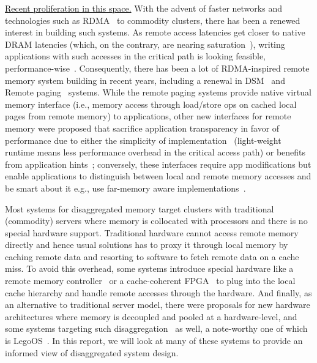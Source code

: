 \vspace{5pt}
\noindent \uline{Recent proliferation in this space.}
With the advent of faster networks and technologies such as 
RDMA~\cite{farm} to commodity clusters, there has been a renewed 
interest in building such systems. 
As remote access latencies 
get closer to native DRAM latencies (which, on the contrary, 
are nearing saturation~\cite{Aguilera2017}),
writing applications with such accesses 
in the critical path is looking feasible, 
performance-wise~\cite{netdisagg}. 
Consequently, there has been a lot of RDMA-inspired remote 
memory system building in recent years, including a renewal in
DSM~\cite{farm, gam,dspm,ltdsm} and Remote 
paging~\cite{Lim2012,bladedisagg1,infiniswap,zswap,fastswap,leap} 
systems. While the remote paging systems provide native virtual memory 
interface (i.e., memory access through load/store ops on cached 
local pages from remote memory) to applications, 
other new interfaces for remote memory were proposed that 
sacrifice application transparency in favor of performance 
due to either the simplicity of 
implementation~\cite{remregions,literdma} (light-weight runtime 
means less performance overhead in the critical access path) or 
benefits from application hints~\cite{aifm}; 
conversely, these interfaces require app modifications but
enable applications to distinguish between local and remote 
memory accesses and be smart about it e.g., use far-memory 
aware implementations~\cite{Aguilera2019,semeru}.

Most systems for disaggregated memory target clusters with 
traditional (commodity) servers where memory is collocated 
with processors and there is no special hardware support.
Traditional hardware cannot access remote memory directly 
 and hence usual solutions has to proxy it  
through local memory by caching remote data and resorting to 
software to fetch remote data on a cache miss. To avoid 
this overhead, some systems introduce special hardware 
like a remote memory controller~\cite{sonuma} or a 
cache-coherent FPGA~\cite{kona} to plug into 
the local cache hierarchy and handle remote accesses through 
the hardware. And finally, as an alternative to traditional 
server model, there were proposals for new 
hardware architectures where memory is decoupled and pooled
at a hardware-level, and some systems targeting such 
disaggregation~\cite{sonuma,bladedisagg1,legoos} as well, 
a note-worthy one of which is LegoOS~\cite{legoos}. In this 
report, we will look at many of these systems to provide an 
informed view of disaggregated system design.
